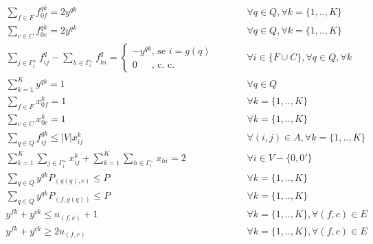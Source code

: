\documentclass[12pt]{article}
\begin{document}
\begin{eqnarray}
\label{eq01}
  \sum\limits_{f \in F} {f^{qk}_{0f}} = 2 y^{qk} & \hspace{1cm} & \forall q \in Q, \forall k = \{1,..,K\} \\
\label{eq02}
  \sum\limits_{c \in C} {f^{qk}_{0c}} = 2 y^{qk} & \hspace{1cm} & \forall q \in Q, \forall k = \{1,..,K\} \\
\label{eq03}
  \sum\limits_{j \in \Gamma^+_i} {f^q_{ij}} - \sum\limits_{h \in \Gamma^-_i}{f^q_{hi}} = \left\{
\begin{array} {l}
-y^{qk} \textrm{, se } i = g(q)\\
0 \,\,\,\, \,\,\,\,\,\textrm{, c. c.}
\end{array} \right.
& \hspace{1cm} & \forall i \in \{F \cup C\}, \forall q \in Q, \forall k\\
\label{eq04}
  \sum\limits_{k=1}^K {y^{qk}} = 1 & \hspace{1cm} & \forall q \in Q \\
\label{eq05}
  \sum\limits_{f \in F} {x^k_{0f}} = 1 & \hspace{1cm} & \forall k = \{1,..,K\} \\
\label{eq06}
  \sum\limits_{c \in C} {x^k_{0c}} = 1 & \hspace{1cm} & \forall k = \{1,..,K\} \\
\label{eq07}
  \sum\limits_{q \in Q} {f^{qk}_{ij}} \le |V| x^k_{ij} & \hspace{1cm} & \forall (i,j) \in A, \forall k = \{1,..,K\} \\
\label{eq08}
  \sum\limits_{k=1}^K {\sum\limits_{j \in \Gamma^+_i}{x^k_{ij}}} + \sum\limits_{k=1}^K {\sum\limits_{h \in \Gamma^-_i}{x_{hi}}} = 2 & \hspace{1cm} & \forall i \in V - \{0,0'\} \\
\label{eq09}
  \sum\limits_{q \in Q} {y^{qk} P_{(g(q),c)}} \le P & \hspace{1cm} & \forall k = \{1,..,K\} \\
\label{eq10}
  \sum\limits_{q \in Q} {y^{qk} P_{(f,g(q))}} \le P & \hspace{1cm} & \forall k = \{1,..,K\} \\
\label{eq11}
  y^{fk} + y^{ck} \le u_{(f,c)} + 1 & \hspace{1cm} & \forall k = \{1,..,K\}, \forall (f,c) \in E \\
\label{eq12}
  y^{fk} + y^{ck} \ge 2u_{(f,c)} & \hspace{1cm} & \forall k = \{1,..,K\}, \forall (f,c) \in E 
\end{eqnarray}
\end{document}
